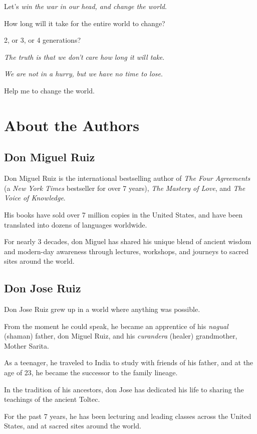 \documentclass{article}
\numberwithin{equation}{section}
\begin{document}
Let's \textit{win the war in our head, and change the world}.

How long will it take for the entire world to change?

2, or 3, or 4 generations?

\textit{The truth is that we don't care how long it will take}.

\textit{We are not in a hurry, but we have no time to lose}.

Help me to change the world.

\section{About the Authors}

\subsection{Don Miguel Ruiz}

Don Miguel Ruiz is the international bestselling author of \textit{The Four Agreements} (a \textit{New York Times} bestseller for over 7 years), \textit{The Mastery of Love}, and \textit{The Voice of Knowledge}.

His books have sold over 7 million copies in the United States, and have been translated into dozens of languages worldwide.

For nearly 3 decades, don Miguel has shared his unique blend of ancient wisdom and modern-day awareness through lectures, workshops, and journeys to sacred sites around the world.

\subsection{Don Jose Ruiz}
Don Jose Ruiz grew up in a world where anything was possible.

From the moment he could speak, he became an apprentice of his \textit{nagual} (shaman) father, don Miguel Ruiz, and his \textit{curandera} (healer) grandmother, Mother Sarita.

As a teenager, he traveled to India to study with friends of his father, and at the age of 23, he became the successor to the family lineage.

In the tradition of his ancestors, don Jose has dedicated his life to sharing the teachings of the ancient Toltec.

For the past 7 years, he has been lecturing and leading classes across the United States, and at sacred sites around the world.
\end{document}
